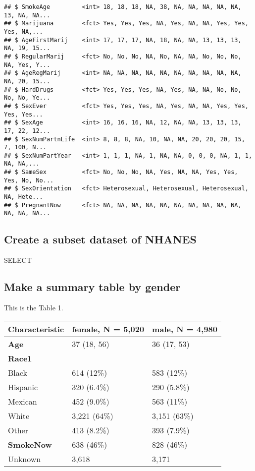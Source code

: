 \documentclass[
]{article}
\begin{document}
\begin{verbatim}
## $ SmokeAge         <int> 18, 18, 18, NA, 38, NA, NA, NA, NA, NA, 13, NA, NA...
## $ Marijuana        <fct> Yes, Yes, Yes, NA, Yes, NA, NA, Yes, Yes, Yes, NA,...
## $ AgeFirstMarij    <int> 17, 17, 17, NA, 18, NA, NA, 13, 13, 13, NA, 19, 15...
## $ RegularMarij     <fct> No, No, No, NA, No, NA, NA, No, No, No, NA, Yes, Y...
## $ AgeRegMarij      <int> NA, NA, NA, NA, NA, NA, NA, NA, NA, NA, NA, 20, 15...
## $ HardDrugs        <fct> Yes, Yes, Yes, NA, Yes, NA, NA, No, No, No, No, Ye...
## $ SexEver          <fct> Yes, Yes, Yes, NA, Yes, NA, NA, Yes, Yes, Yes, Yes...
## $ SexAge           <int> 16, 16, 16, NA, 12, NA, NA, 13, 13, 13, 17, 22, 12...
## $ SexNumPartnLife  <int> 8, 8, 8, NA, 10, NA, NA, 20, 20, 20, 15, 7, 100, N...
## $ SexNumPartYear   <int> 1, 1, 1, NA, 1, NA, NA, 0, 0, 0, NA, 1, 1, NA, NA,...
## $ SameSex          <fct> No, No, No, NA, Yes, NA, NA, Yes, Yes, Yes, No, No...
## $ SexOrientation   <fct> Heterosexual, Heterosexual, Heterosexual, NA, Hete...
## $ PregnantNow      <fct> NA, NA, NA, NA, NA, NA, NA, NA, NA, NA, NA, NA, NA...
\end{verbatim}

\hypertarget{create-a-subset-dataset-of-nhanes}{%
\subsection{Create a subset dataset of
NHANES}\label{create-a-subset-dataset-of-nhanes}}

SELECT

\hypertarget{make-a-summary-table-by-gender}{%
\subsection{Make a summary table by
gender}\label{make-a-summary-table-by-gender}}

This is the Table 1.

\begin{longtable}[]{@{}lll@{}}
\toprule
\textbf{Characteristic} & \textbf{female}, N = 5,020 & \textbf{male}, N
= 4,980\tabularnewline
\midrule
\endhead
\textbf{Age} & 37 (18, 56) & 36 (17, 53)\tabularnewline
\textbf{Race1} & &\tabularnewline
Black & 614 (12\%) & 583 (12\%)\tabularnewline
Hispanic & 320 (6.4\%) & 290 (5.8\%)\tabularnewline
Mexican & 452 (9.0\%) & 563 (11\%)\tabularnewline
White & 3,221 (64\%) & 3,151 (63\%)\tabularnewline
Other & 413 (8.2\%) & 393 (7.9\%)\tabularnewline
\textbf{SmokeNow} & 638 (46\%) & 828 (46\%)\tabularnewline
Unknown & 3,618 & 3,171\tabularnewline
\bottomrule
\end{longtable}
\end{document}
